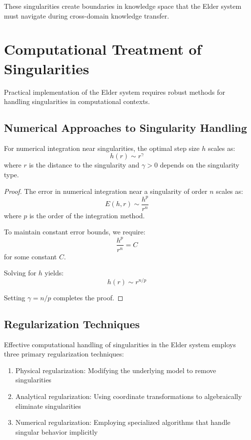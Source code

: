 These singularities create boundaries in knowledge space that the Elder system must navigate during cross-domain knowledge transfer.

\section{Computational Treatment of Singularities}

Practical implementation of the Elder system requires robust methods for handling singularities in computational contexts.

\subsection{Numerical Approaches to Singularity Handling}

\begin{theorem}
For numerical integration near singularities, the optimal step size $h$ scales as:
\begin{equation}
h(r) \sim r^{\gamma}
\end{equation}
where $r$ is the distance to the singularity and $\gamma > 0$ depends on the singularity type.
\end{theorem}

\begin{proof}
The error in numerical integration near a singularity of order $n$ scales as:
\begin{equation}
E(h, r) \sim \frac{h^p}{r^n}
\end{equation}
where $p$ is the order of the integration method.

To maintain constant error bounds, we require:
\begin{equation}
\frac{h^p}{r^n} = C
\end{equation}
for some constant $C$.

Solving for $h$ yields:
\begin{equation}
h(r) \sim r^{n/p}
\end{equation}

Setting $\gamma = n/p$ completes the proof.
\end{proof}

\subsection{Regularization Techniques}

\begin{theorem}
Effective computational handling of singularities in the Elder system employs three primary regularization techniques:
\begin{enumerate}
    \item Physical regularization: Modifying the underlying model to remove singularities
    \item Analytical regularization: Using coordinate transformations to algebraically eliminate singularities
    \item Numerical regularization: Employing specialized algorithms that handle singular behavior implicitly
\end{enumerate}
\end{theorem}

